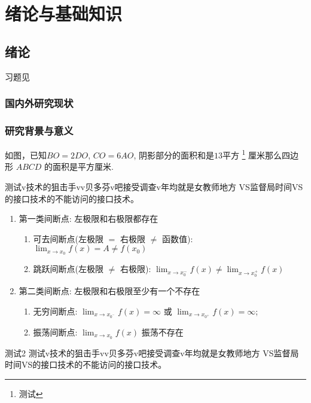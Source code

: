 
\part{绪论与基础知识}

\chapter{绪论}

\begin{flushright}
  \faHandPointRight 习题见 
\end{flushright}

\section{国内外研究现状}

\zhlipsum[1-3]

\section*{研究背景与意义}


\zhlipsum[2]

\begin{question*}
  \taskGrade
  如图，已知$BO=2DO$, $CO=6AO$, 阴影部分的面积和是$13$平方 \footnote{测试}
  厘米那么四边形 $ABCD$ 的面积是\fillin[]平方厘米.
\end{question*}

\begin{knowledge}
  测试v技术的狙击手vv贝多芬v吧接受调查v年均就是女教师地方 VS监督局时间VS的接口技术的不能访问的接口技术。
  \begin{enumerate}
    \item 第一类间断点: 左极限和右极限都存在
          \begin{enumerate}
            \item 可去间断点(左极限 $=$ 右极限 $\neq$ 函数值):
                  $\lim _{x \to x_{0}}f(x)=A\neq f(x_{0})$
            \item 跳跃间断点(左极限 $\neq$ 右极限): $\lim _{x \to x_{0}^{-}}f(x) \neq \lim _{x \to x_{0}^{+}}f(x)$
          \end{enumerate}
    \item 第二类间断点: 左极限和右极限至少有一个不存在
          \begin{enumerate}
            \item 无穷间断点: $\lim _{x \to x_{0^-}}f(x)=\infty$ 或 $\lim _{x \to x_{0^+}}f(x)=\infty$;
            \item 振荡间断点: $\lim _{x \to x_{0}}f(x)$ 振荡不存在
          \end{enumerate}
  \end{enumerate}

  测试2
  测试v技术的狙击手vv贝多芬v吧接受调查v年均就是女教师地方 VS监督局时间VS的接口技术的不能访问的接口技术。
\end{knowledge}

